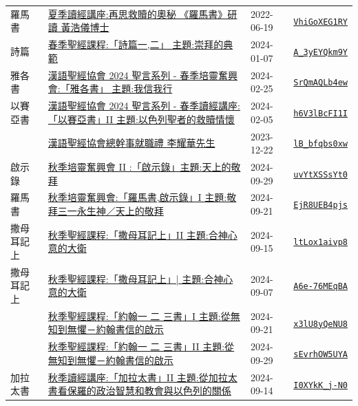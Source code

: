 \documentclass{book}
\begin{document}
{\begin{xltabular}{\textwidth}{|p{0.15\textwidth} p{0.6\textwidth}|p{0.07\textwidth} p{0.1\textwidth}|}
羅馬書   & \hyperref[sec:VhiGoXEG1RY]{夏季讀經講座:再思救贖的奧秘 《羅馬書》研讀 黃浩儀博士} & 2022-06-19 & \href{https://youtube.com/watch?v=VhiGoXEG1RY}{\texttt{VhiGoXEG1RY}} \\
詩篇   & \hyperref[sec:A_3yEYQkm9Y]{春季聖經課程:「詩篇一,二」 主題:崇拜的典範} & 2024-01-07 & \href{https://youtube.com/watch?v=A_3yEYQkm9Y}{\texttt{A\_3yEYQkm9Y}} \\
雅各書   & \hyperref[sec:SrQmAQLb4ew]{漢語聖經協會 2024 聖言系列 - 春季培靈奮興會:「雅各書」 主題:我信我行} & 2024-02-25 & \href{https://youtube.com/watch?v=SrQmAQLb4ew}{\texttt{SrQmAQLb4ew}} \\
以賽亞書   & \hyperref[sec:h6V3lBcFI1I]{漢語聖經協會 2024 聖言系列 - 春季讀經講座:「以賽亞書」II 主題:以色列聖者的救贖情懷} & 2024-02-05 & \href{https://youtube.com/watch?v=h6V3lBcFI1I}{\texttt{h6V3lBcFI1I}} \\
    & \hyperref[sec:lB_bfqbs0xw]{漢語聖經協會總幹事就職禮 李耀華先生} & 2023-12-22 & \href{https://youtube.com/watch?v=lB_bfqbs0xw}{\texttt{lB\_bfqbs0xw}} \\
啟示錄   & \hyperref[sec:uvYtXSSsYt0]{秋季培靈奮興會 II :「啟示錄」主題:天上的敬拜} & 2024-09-29 & \href{https://youtube.com/watch?v=uvYtXSSsYt0}{\texttt{uvYtXSSsYt0}} \\
羅馬書   & \hyperref[sec:EjR8UEB4pjs]{秋季培靈奮興會:「羅馬書,啟示錄」I 主題:敬拜三一永生神／天上的敬拜} & 2024-09-21 & \href{https://youtube.com/watch?v=EjR8UEB4pjs}{\texttt{EjR8UEB4pjs}} \\
撒母耳記上   & \hyperref[sec:ltLox1aivp8]{秋季聖經課程:「撒母耳記上」II 主題:合神心意的大衛} & 2024-09-15 & \href{https://youtube.com/watch?v=ltLox1aivp8}{\texttt{ltLox1aivp8}} \\
撒母耳記上   & \hyperref[sec:A6e_76MEqBA]{秋季聖經課程:「撒母耳記上」| 主題:合神心意的大衛} & 2024-09-07 & \href{https://youtube.com/watch?v=A6e-76MEqBA}{\texttt{A6e-76MEqBA}} \\
    & \hyperref[sec:x3lU8yQeNU8]{秋季聖經課程:「約翰一 二 三書」I 主題:從無知到無懼－約翰書信的啟示} & 2024-09-21 & \href{https://youtube.com/watch?v=x3lU8yQeNU8}{\texttt{x3lU8yQeNU8}} \\
    & \hyperref[sec:sEvrhOW5UYA]{秋季聖經課程:「約翰一 二 三書」II 主題:從無知到無懼－約翰書信的啟示} & 2024-09-29 & \href{https://youtube.com/watch?v=sEvrhOW5UYA}{\texttt{sEvrhOW5UYA}} \\
加拉太書   & \hyperref[sec:I0XYkK_j_N0]{秋季讀經講座:「加拉太書」II 主題:從加拉太書看保羅的政治智慧和教會與以色列的關係} & 2024-09-14 & \href{https://youtube.com/watch?v=I0XYkK_j-N0}{\texttt{I0XYkK\_j-N0}} \\

\end{xltabular}}
\end{document}
